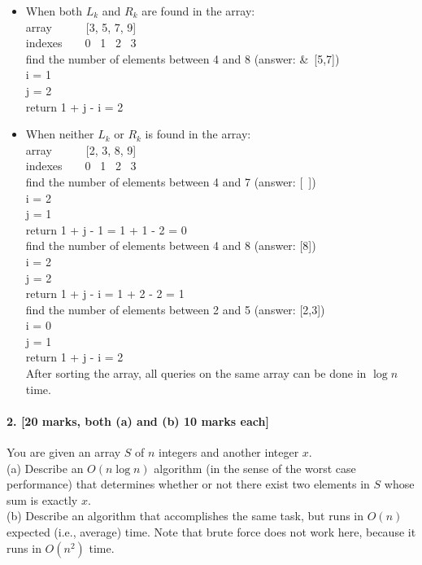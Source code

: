 \documentclass[a4paper]{scrartcl}
\begin{document}
\begin{itemize}
\item When both $L_k$ and $R_k$ are found in the array:\\
\textsf{ array\ \ \ \ \ \ [3, 5, 7, 9]}\\
  \textsf{indexes\ \ \ \  0 \ 1 \ 2 \ 3}\\
  find the number of elements between 4 and 8 (answer: &\ [5,7])\\
  i = 1\\
  j = 2\\
return 1 + j - i = 2
\item When neither $L_k$ or $R_k$ is found in the array:\\
\textsf{ array\ \ \ \ \ \ [2, 3, 8, 9]}\\
\textsf{indexes\ \ \ \  0 \ 1 \ 2 \ 3}\\
find the number of elements between 4 and 7 (answer: [\ ])\\
i = 2\\
\quad j = 1\\
return 1 + j - 1 = 1 + 1 - 2 = 0 \\
find the number of elements between 4 and 8 (answer: [8])\\
i = 2\\
j = 2\\
return 1 + j - i = 1 + 2 - 2 = 1\\
find the number of elements between  2 and 5 (answer: [2,3])\\
i = 0\\
j = 1\\
return 1 + j - i = 2 \\
After sorting the array, all queries on the same array can be done in $\log{n}$ time.
\end{itemize}
\paragraph{2. [20 marks, both (a) and (b) 10 marks each]}
\label{sec:Question 2}
You are given an array $S$ of $n$ integers and
another integer $x$.\\
(a) Describe an $O(n \log{n})$ algorithm (in the sense of the worst case performance) that determines whether or not there exist two elements in $S$ whose sum is exactly $x$.\\
(b) Describe an algorithm that accomplishes the same task, but runs in $O(n)$ expected (i.e., average) time.
Note that brute force does not work here, because it runs in $O(n^2)$ time.
\end{document}
